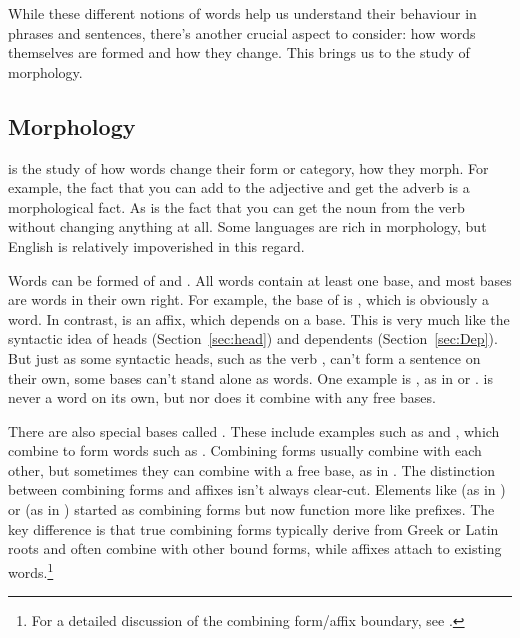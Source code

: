 While these different notions of words help us understand their behaviour in phrases and sentences, there's another crucial aspect to consider: how words themselves are formed and how they change. This brings us to the study of morphology.

\subsection{Morphology} \label{sec:morphology}

 is the study of how words change their form or category, how they morph. For example, the fact that you can add  to the adjective  and get the adverb  is a morphological fact. As is the fact that you can get the noun  from the verb  without changing anything at all. Some languages are rich in morphology, but English is relatively impoverished in this regard.

Words can be formed of  and . All words contain at least one base, and most bases are words in their own right. For example, the base of  is , which is obviously a word. In contrast,  is an affix, which depends on a base. This is very much like the syntactic idea of heads (Section~\ref{sec:head}) and dependents (Section~\ref{sec:Dep}). But just as some syntactic heads, such as the verb , can't form a sentence on their own, some bases can't stand alone as words. One example is , as in  or .  is never a word on its own, but nor does it combine with any free bases.

There are also special bases called . These include examples such as  and , which combine to form words such as . Combining forms usually combine with each other, but sometimes they can combine with a free base, as in . The distinction between combining forms and affixes isn't always clear-cut. Elements like  (as in ) or  (as in ) started as combining forms but now function more like prefixes. The key difference is that true combining forms typically derive from Greek or Latin roots and often combine with other bound forms, while affixes attach to existing words.\footnote{For a detailed discussion of the combining form/affix boundary, see \citet{Bauer1983}.}

